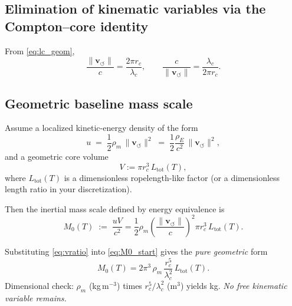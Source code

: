 \documentclass[11pt, a4paper]{article}
\newcommand{\vswirl}{\mathbf{v}_{\!\boldsymbol{\circlearrowleft}}}
\newcommand{\rhoE}{\rho_{\!E}}
\newcommand{\rhom}{\rho_{\!m}}
\newcommand{\rc}{r_c}
\newcommand{\Ltot}{L_{\text{tot}}}
\begin{document}
        \subsection{Elimination of kinematic variables via the Compton--core identity}
            From \eqref{eq:lc_geom},
            \begin{equation}
                \frac{\lVert \vswirl \rVert}{c}=\frac{2\pi \rc}{\lambda_c},
                \qquad
                \frac{c}{\lVert \vswirl \rVert}=\frac{\lambda_c}{2\pi \rc}.
                \label{eq:vratio}
            \end{equation}
        
        \subsection{Geometric baseline mass scale}
            Assume a localized kinetic-energy density of the form
            \begin{equation}
                u \;=\; \frac{1}{2}\rhom\,\lVert \vswirl \rVert^2
                \;=\; \frac{1}{2}\frac{\rhoE}{c^2}\,\lVert \vswirl \rVert^2,
                \label{eq:u_def}
            \end{equation}
            and a geometric core volume
            \begin{equation}
                V := \pi \rc^3\,\Ltot(T),
                \label{eq:V_def}
            \end{equation}
            where $\Ltot(T)$ is a dimensionless ropelength-like factor (or a dimensionless length ratio in your discretization).
            
            Then the inertial mass scale defined by energy equivalence is
            \begin{equation}
                M_0(T) \;:=\; \frac{uV}{c^2}
                = \frac{1}{2}\rhom\left(\frac{\lVert \vswirl \rVert}{c}\right)^2 \pi \rc^3\,\Ltot(T).
                \label{eq:M0_start}
            \end{equation}
            
            Substituting \eqref{eq:vratio} into \eqref{eq:M0_start} gives the \emph{pure geometric} form
            \begin{equation}
                \boxed{
                    M_0(T)
                    = 2\pi^3\,\rhom\,\frac{\rc^5}{\lambda_c^2}\,\Ltot(T).
                }
                \label{eq:M0_geom}
            \end{equation}
            Dimensional check: $\rhom$ (kg\,m$^{-3}$) times $\rc^5/\lambda_c^2$ (m$^3$) yields kg. \emph{No free kinematic variable remains.}
        
\end{document}
